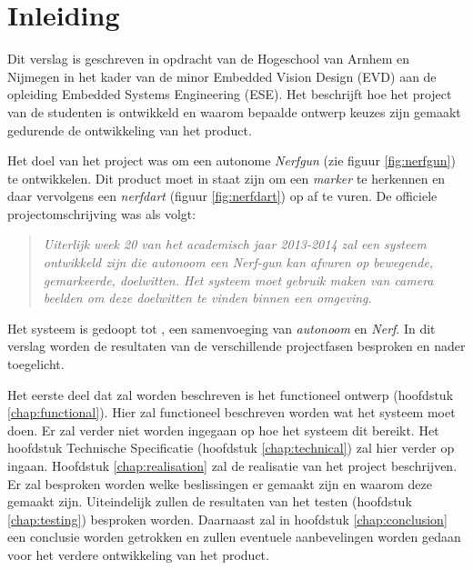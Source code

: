\chapter{Inleiding}
\label{chap:introduction}

%

Dit verslag is geschreven in opdracht van de Hogeschool van Arnhem en Nijmegen
in het kader van de minor Embedded Vision Design (EVD) aan de opleiding Embedded
Systems Engineering (ESE). Het beschrijft hoe het project van de studenten is
ontwikkeld en waarom bepaalde ontwerp keuzes zijn gemaakt gedurende de
ontwikkeling van het product.

Het doel van het project was om een autonome \emph{Nerfgun} (zie figuur
\ref{fig:nerfgun}) te ontwikkelen. Dit product moet in staat zijn om een
\emph{marker} te herkennen en daar vervolgens een \emph{nerfdart} (figuur
\ref{fig:nerfdart}) op af te vuren. De officiele projectomschrijving was als volgt:

\begin{quotation}
\emph{Uiterlijk week 20 van het academisch jaar 2013-2014 zal een systeem
ontwikkeld zijn die autonoom een Nerf-gun kan afvuren op bewegende, gemarkeerde,
doelwitten. Het systeem moet gebruik maken van camera beelden om deze doelwitten
te vinden binnen een omgeving.}
\end{quotation}

Het systeem is gedoopt tot \bold{\autonerf}, een samenvoeging van \emph{autonoom}
en \emph{Nerf}. In dit verslag worden de resultaten van de verschillende
projectfasen besproken en nader toegelicht.

Het eerste deel dat zal worden beschreven is het functioneel ontwerp (hoofdstuk
\ref{chap:functional}). Hier zal functioneel beschreven worden wat het systeem
moet doen. Er zal verder niet worden ingegaan op hoe het systeem dit bereikt.
Het hoofdstuk Technische Specificatie (hoofdstuk \ref{chap:technical}) zal hier
verder op ingaan. Hoofdstuk \ref{chap:realisation} zal de realisatie van het
project beschrijven. Er zal besproken worden welke beslissingen er gemaakt zijn
en waarom deze gemaakt zijn. Uiteindelijk zullen de resultaten van het testen
(hoofdstuk \ref{chap:testing}) besproken worden. Daarnaast zal in hoofdstuk
\ref{chap:conclusion} een conclusie worden getrokken en zullen eventuele
aanbevelingen worden gedaan voor het verdere ontwikkeling van het product.
